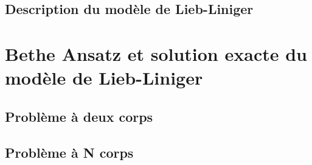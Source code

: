 

%






\subsection{Description du modèle de Lieb-Liniger}
%

\section{Bethe Ansatz et solution exacte du modèle de Lieb-Liniger}
\subsection{Problème à deux corps}
\subsection{Problème à N corps}
